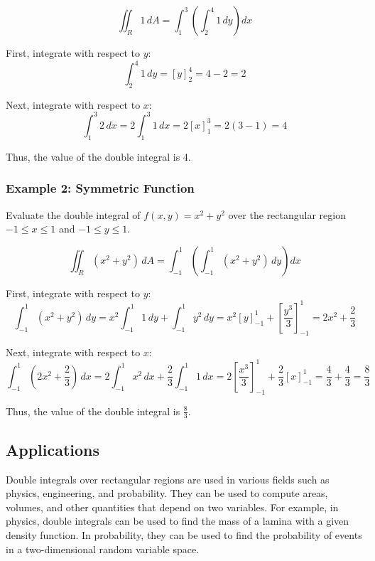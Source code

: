 \documentclass{article}
\begin{document}
\[
\iint_R 1 \, dA = \int_1^3 \left( \int_2^4 1 \, dy \right) dx
\]

First, integrate with respect to \( y \):
\[
\int_2^4 1 \, dy = \left[ y \right]_2^4 = 4 - 2 = 2
\]

Next, integrate with respect to \( x \):
\[
\int_1^3 2 \, dx = 2 \int_1^3 1 \, dx = 2 \left[ x \right]_1^3 = 2(3 - 1) = 4
\]

Thus, the value of the double integral is 4.

\subsubsection*{Example 2: Symmetric Function}
Evaluate the double integral of \( f(x, y) = x^2 + y^2 \) over the rectangular region \( -1 \leq x \leq 1 \) and \( -1 \leq y \leq 1 \).

\[
\iint_R (x^2 + y^2) \, dA = \int_{-1}^1 \left( \int_{-1}^1 (x^2 + y^2) \, dy \right) dx
\]

First, integrate with respect to \( y \):
\[
\int_{-1}^1 (x^2 + y^2) \, dy = x^2 \int_{-1}^1 1 \, dy + \int_{-1}^1 y^2 \, dy = x^2 \left[ y \right]_{-1}^1 + \left[ \frac{y^3}{3} \right]_{-1}^1 = 2x^2 + \frac{2}{3}
\]

Next, integrate with respect to \( x \):
\[
\int_{-1}^1 \left( 2x^2 + \frac{2}{3} \right) \, dx = 2 \int_{-1}^1 x^2 \, dx + \frac{2}{3} \int_{-1}^1 1 \, dx = 2 \left[ \frac{x^3}{3} \right]_{-1}^1 + \frac{2}{3} \left[ x \right]_{-1}^1 = \frac{4}{3} + \frac{4}{3} = \frac{8}{3}
\]

Thus, the value of the double integral is \(\frac{8}{3}\).

\subsection*{Applications}
Double integrals over rectangular regions are used in various fields such as physics, engineering, and probability. They can be used to compute areas, volumes, and other quantities that depend on two variables. For example, in physics, double integrals can be used to find the mass of a lamina with a given density function. In probability, they can be used to find the probability of events in a two-dimensional random variable space.
\end{document}
